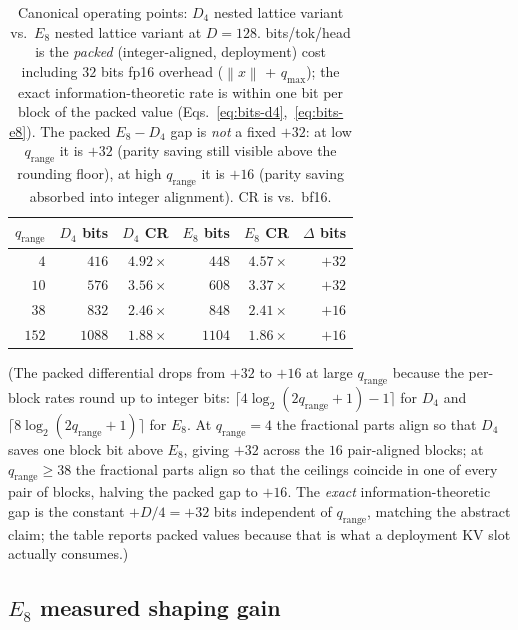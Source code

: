\documentclass[10pt,a4paper]{article}
\theoremstyle{definition}
\theoremstyle{plain}
\newcommand{\norm}[1]{\left\lVert#1\right\rVert}
\begin{document}
\begin{table}[H]
\centering
\small
\caption{Canonical operating points: $D_4$ nested lattice variant
vs.\ $E_8$ nested lattice variant at $D = 128$.
bits/tok/head is the \emph{packed} (integer-aligned, deployment)
cost including $32$ bits fp16 overhead ($\norm{x}$ +
$q_\mathrm{max}$); the exact information-theoretic rate is within
one bit per block of the packed value
(Eqs.~\eqref{eq:bits-d4},~\eqref{eq:bits-e8}). The packed
$E_8 - D_4$ gap is \emph{not} a fixed $+32$: at low
$q_\mathrm{range}$ it is $+32$ (parity saving still visible above
the rounding floor), at high $q_\mathrm{range}$ it is $+16$
(parity saving absorbed into integer alignment). CR is vs.\ bf16.}
\label{tab:v15-bits}
\begin{tabular}{rrrrrr}
  \toprule
  $q_\mathrm{range}$ & $D_4$ bits & $D_4$ CR & $E_8$ bits & $E_8$ CR & $\Delta$ bits \\
  \midrule
  $4$   & $416$  & $4.92\times$ & $448$  & $4.57\times$ & $+32$ \\
  $10$  & $576$  & $3.56\times$ & $608$  & $3.37\times$ & $+32$ \\
  $38$  & $832$  & $2.46\times$ & $848$  & $2.41\times$ & $+16$ \\
  $152$ & $1088$ & $1.88\times$ & $1104$ & $1.86\times$ & $+16$ \\
  \bottomrule
\end{tabular}
\end{table}

(The packed differential drops from $+32$ to $+16$ at large
$q_\mathrm{range}$ because the per-block rates round up to integer
bits: $\lceil 4\log_2(2q_\mathrm{range}+1) - 1 \rceil$ for $D_4$
and $\lceil 8\log_2(2q_\mathrm{range}+1) \rceil$ for $E_8$. At
$q_\mathrm{range} = 4$ the fractional parts align so that $D_4$
saves one block bit above $E_8$, giving $+32$ across the
$16$ pair-aligned blocks; at $q_\mathrm{range} \geq 38$ the
fractional parts align so that the ceilings coincide in one of
every pair of blocks, halving the packed gap to $+16$.
The \emph{exact} information-theoretic gap is the constant
$+D/4 = +32$ bits independent of $q_\mathrm{range}$, matching the
abstract claim; the table reports packed values because that is
what a deployment KV slot actually consumes.)

\subsection{$E_8$ measured shaping gain}
\label{sec:v15-shaping-gain}
\end{document}
